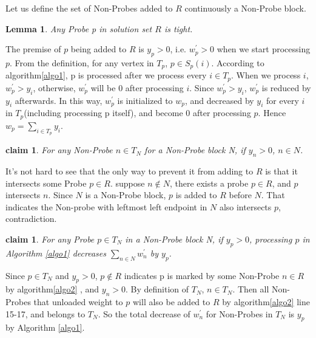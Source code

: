 \documentclass[preprint,12pt,authoryear]{elsarticle}
\newtheorem{lemma}[theorem]{Lemma}
\newtheorem{claim}[theorem]{claim}
\newenvironment{proof}[1][Proof]{\begin{trivlist}
\item[\hskip \labelsep {\bfseries #1}]}{\end{trivlist}}
\newenvironment{definition}[1][Definition]{\begin{trivlist}
\item[\hskip \labelsep {\bfseries #1}]}{\end{trivlist}}
\begin{document}
\begin{definition}
\label{block}
Let us define the set of Non-Probes added to $R$ continuously a Non-Probe block.
\end{definition}



\begin{lemma}
\label{t0}
Any Probe p in solution set $R$ is tight.
\end{lemma}

\begin{proof}
The premise of $p$ being added to $R$ is $y_{p} > 0$, i.e. $w_{p}^{'} > 0$ when we start processing $p$. From the definition, for any vertex in $T_{p}$, $p \in S_{p}(i)$. According to algorithm\ref{algo1}, p is processed after we process every $i \in T_{p}$. When we process $i$, $w_{p}^{'} > y_{i}$, otherwise, $w_{p}^{'}$ will be 0 after processing $i$. Since $w_{p}^{'} > y_{i}$, $w_{p}^{'}$ is reduced by $y_{i}$ afterwards. In this way, $w_{p}^{'}$ is initialized to $w_{p}$, and decreased by $y_{i}$ for every $i$ in $T_{p}$(including processing p itself), and become $0$ after processing $p$. Hence $w_{p} = \sum\limits_{i \in T_{p}} y_{i}$.

\end{proof}

\begin{claim}
\label{t1}
For any Non-Probe $n \in T_{N}$ for a Non-Probe block N, if $y_n > 0$, $n \in N$.
\end{claim}
\begin{proof}
It's not hard to see that the only way to prevent it from adding to $R$ is that it intersects some Probe $p \in R$. suppose $n \notin N$, there exists a probe $p \in R$, and $p$ intersects $n$. Since $N$ is a Non-Probe block, $p$ is added to $R$ before $N$. That indicates the Non-probe with leftmost left endpoint in $N$ also intersects $p$, contradiction.
\end{proof}

\begin{claim}
\label{t2}
For any Probe $p \in T_{N}$ in a Non-Probe block N, if $y_p > 0$, processing $p$ in Algorithm \ref{algo1} decreases $\sum\limits_{n \in N} w_{n}^{'}$ by $y_p$.
\end{claim}
\begin{proof}
Since $p \in T_{N}$ and $y_p > 0$, $p \notin R$ indicates p is marked by some Non-Probe $n \in R$ by algorithm\ref{algo2} 
, and $y_{n} > 0$. By definition of $T_{N}$, $n \in T_{N}$. Then all Non-Probes that unloaded weight to $p$ will also be added to $R$ by algorithm\ref{algo2} line 15-17, and belongs to $T_{N}$. So the total decrease of $w_n^{'}$ for Non-Probes in $T_{N}$ is $y_{p}$ by Algorithm \ref{algo1}.
\end{proof}
\end{document}
